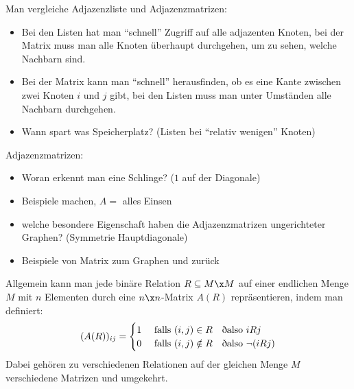\begin{tutorium}
  Man vergleiche Adjazenzliste und Adjazenzmatrizen:
  \begin{itemize}
  \item Bei den Listen hat man "`schnell"' Zugriff auf alle adjazenten
    Knoten, bei der Matrix muss man alle Knoten überhaupt durchgehen, um
    zu sehen, welche Nachbarn sind.
  \item Bei der Matrix kann man "`schnell"' herausfinden, ob es eine
    Kante zwischen zwei Knoten $i$ und $j$ gibt, bei den Listen muss man
    unter Umständen alle Nachbarn durchgehen.
  \item Wann spart was Speicherplatz? (Listen bei "`relativ wenigen"' Knoten)
  \end{itemize}
  
  Adjazenzmatrizen:
  \begin{itemize}
  \item Woran erkennt man eine Schlinge? ($1$ auf der Diagonale)
  \item Beispiele machen, \zB $A=$ alles Einsen
  \item welche besondere Eigenschaft haben die Adjazenzmatrizen
    ungerichteter Graphen? (Symmetrie \bzgl Hauptdiagonale)
  \item Beispiele von Matrix zum Graphen und zurück
  \end{itemize}

\end{tutorium}
% 
Allgemein kann man jede binäre Relation $R\subseteq M\x M$ auf einer
endlichen Menge $M$ mit $n$ Elementen durch eine $n\x n$-Matrix $A(R)$
repräsentieren, indem man definiert:
% 
\[
(A(R))_{ij} = \begin{cases}
  1 & \text{ falls } (i,j)\in R    \text{\quad \dh also } i R j \\
  0 & \text{ falls } (i,j)\notin R \text{\quad \dh also } \lnot (i R j) 
\end{cases}
\]
% 
Dabei gehören zu verschiedenen Relationen auf der gleichen Menge $M$
verschiedene Matrizen und umgekehrt.

